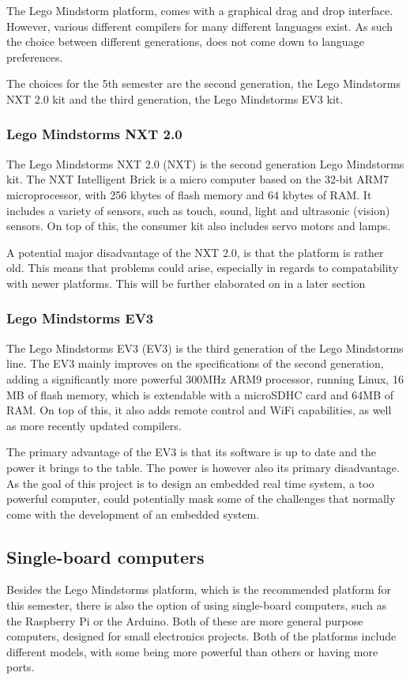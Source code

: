 The Lego Mindstorm platform, comes with a graphical drag and drop interface.
However, various different compilers for many different languages exist.
As such the choice between different generations, does not come down to language preferences.

The choices for the 5th semester are the second generation, the Lego Mindstorms NXT 2.0 kit and the third generation, the Lego Mindstorms EV3 kit.

\subsubsection{Lego Mindstorms NXT 2.0}
The Lego Mindstorms NXT 2.0 (NXT) is the second generation Lego Mindstorms kit.
The NXT Intelligent Brick is a micro computer based on the 32-bit ARM7 microprocessor, with 256 kbytes of flash memory and 64 kbytes of RAM\cite{nxt2userguide}.
It includes a variety of sensors, such as touch, sound, light and ultrasonic (vision) sensors.
On top of this, the consumer kit also includes servo motors and lamps.

A potential major disadvantage of the NXT 2.0, is that the platform is rather old.
This means that problems could arise, especially in regards to compatability with newer platforms.
This will be further elaborated on in a later section

\subsubsection{Lego Mindstorms EV3}
The  Lego Mindstorms EV3 (EV3) is the third generation of the Lego Mindstorms line.
The EV3 mainly improves on the specifications of the second generation, adding a significantly more powerful 300MHz ARM9 processor, running Linux, 16 MB of flash memory, which is extendable with a microSDHC card and 64MB of RAM\cite{ev3userguide}.
On top of this, it also adds remote control and WiFi capabilities, as well as more recently updated compilers.

The primary advantage of the EV3 is that its software is up to date and the power it brings to the table.
The power is however also its primary disadvantage.
As the goal of this project is to design an embedded real time system, a too powerful computer, could potentially mask some of the challenges that normally come with the development of an embedded system.

\subsection{Single-board computers}
Besides the Lego Mindstorms platform, which is the recommended platform for this semester, there is also the option of using single-board computers, such as the Raspberry Pi or the Arduino.
Both of these are more general purpose computers, designed for small electronics projects.
Both of the platforms include different models, with some being more powerful than others or having more ports.

